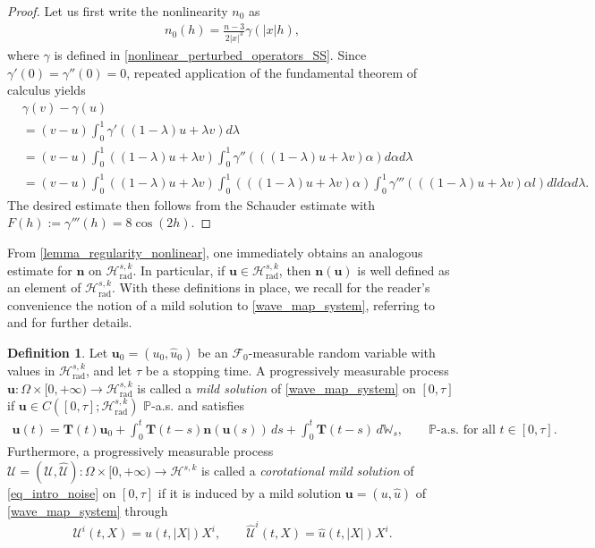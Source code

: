 \documentclass[12pt,reqno]{amsart}
\theoremstyle{plain}
\theoremstyle{remark}
\theoremstyle{plain}
\theoremstyle{definition}
\newtheorem{definition}[theorem]{Definition}
\numberwithin{equation}{section}
\numberwithin{equation}{section}
\newcommand{\HH}{\mathcal{H}}
\begin{document}
	\begin{proof}
		Let us first write the nonlinearity $n_0$ as
        \begin{align*}
		    n_0(h)=\frac{n-3}{2|x|^3}\gamma(|x|h),
		\end{align*}
        where $\gamma$ is defined in \eqref{nonlinear_perturbed_operators_SS}. 
		Since $\gamma'(0)=\gamma''(0)=0$, repeated application of the fundamental theorem of calculus yields
\begin{align*}
			&\gamma(v)-\gamma(u)\\ &=(v-u)\int_0^1  \gamma'((1-\lambda)u+\lambda v) d\lambda\\ & =  (v-u)\int_0^1 \left((1-\lambda) u+\lambda v\right) \int_0^1 \gamma''(\left((1-\lambda)u+\lambda v\right)\alpha) d\alpha d\lambda\\ & = (v-u)\int_0^1 \left((1-\lambda) u+\lambda v \right)\int_0^1 \left(\left((1-\lambda)u+\lambda v \right)\alpha\right) \int_0^1 \gamma'''(\left((1-\lambda)u+\lambda v \right)\alpha l)dl d\alpha d\lambda.
		\end{align*}
		The desired estimate then follows from  the Schauder estimate \cite[Proposition~A.1]{glogic2025globally} with $F(h) := \gamma'''(h)= 8\cos(2h)$.
	\end{proof}
From \autoref{lemma_regularity_nonlinear}, one immediately obtains an analogous estimate for $\mathbf{n}$ on $\HH_{\mathrm{rad}}^{s,k}$. In particular, if $\mathbf{u} \in \HH_{\mathrm{rad}}^{s,k}$, then $\mathbf{n}(\mathbf{u})$ is well defined as an element of $\HH_{\mathrm{rad}}^{s,k}$. With these definitions in place, we recall for the reader’s convenience the notion of a mild solution to \eqref{wave_map_system}, referring to \cite{da2014stochastic} and \cite{agresti2025nonlinear} for further details.

\begin{definition}\label{mild_solution}
Let $\mathbf{u}_0 = (u_0, \hat{u}_0)$ be an $\mathcal{F}_0$-measurable random variable with values in $\HH_{\mathrm{rad}}^{s,k}$, and let $\tau$ be a stopping time.  
A progressively measurable process $\mathbf{u} : \Omega \times [0, +\infty) \to \HH_{\mathrm{rad}}^{s,k}$ is called a \emph{mild solution} of \eqref{wave_map_system} on $[0,\tau]$ if  
\(\mathbf{u} \in C([0, \tau]; \HH_{\mathrm{rad}}^{s,k})\) $\mathbb{P}$-a.s. and satisfies
\begin{align*}
\mathbf{u}(t)
  = \mathbf{T}(t)\mathbf{u}_0
  + \int_0^t \mathbf{T}(t-s)\mathbf{n}(\mathbf{u}(s))\,ds
  + \int_0^t \mathbf{T}(t-s)\,d\mathbb{W}_s,
  \qquad \mathbb{P}\text{-a.s. for all } t \in [0,\tau].
\end{align*}
Furthermore, a progressively measurable process $\boldsymbol{\mathcal{U}} = (\mathcal{U}, \hat{\mathcal{U}}) : \Omega \times [0, +\infty) \to \HH^{s,k}$ is called a \emph{corotational mild solution} of \eqref{eq_intro_noise} on $[0,\tau]$ if it is induced by a mild solution $\mathbf{u} = (u, \hat{u})$ of \eqref{wave_map_system} through
\[
\mathcal{U}^i(t,X) = u(t, |X|)X^i, \qquad
\hat{\mathcal{U}}^i(t,X) = \hat{u}(t, |X|)X^i.
\]
\end{definition}
\end{document}
